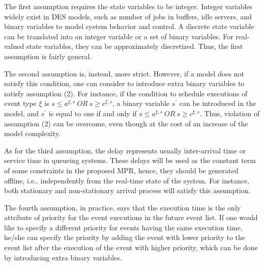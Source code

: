 \documentclass[suppldata]{interact}
\theoremstyle{plain}
\theoremstyle{definition}
\theoremstyle{remark}
\begin{document}
The first assumption requires the state variables to be integer. Integer variables widely exist in DES models, such as number of jobs in buffers, idle servers, and binary variables to model system behavior and control. A discrete state variable can be translated into an integer variable or a set of binary variables. For real-valued state variables, they can be approximately discretized. Thus, the first assumption is fairly general.

The second assumption is, instead, more strict. However, if a model does not satisfy this condition, one can consider to introduce extra binary variables to satisfy assumption (2). For instance, if the condition to schedule executions of event type ${\xi}$ is $s\le a^{\xi,s} \ OR\ s\ge c^{\xi,s}$, a binary variable $s^{'}$ can be introduced in the model, and $s^{'}$ is equal to one if and only if 
$s\le a^{\xi,s} \ OR\ s\ge c^{\xi,s}$. Thus, violation of assumption (2) can be overcome, even though at the cost of an increase of the model complexity.

As for the third assumption, the delay represents usually inter-arrival time or service time in queueing systems. These delays will be used as the constant term of some constraints in the proposed MPR, hence, they should be generated offline, i.e., independently from the real-time state of the system. For instance, both stationary and non-stationary arrival process will satisfy this assumption.

The fourth assumption, in practice, says that the execution time is the only attribute of priority for the event executions in the future event list. If one would like to specify a different priority for events having the same execution time, he/she can specify the priority by adding the event with lower priority to the event list after the execution of the event with higher priority, which can be done by introducing extra binary variables. 
\end{document}

